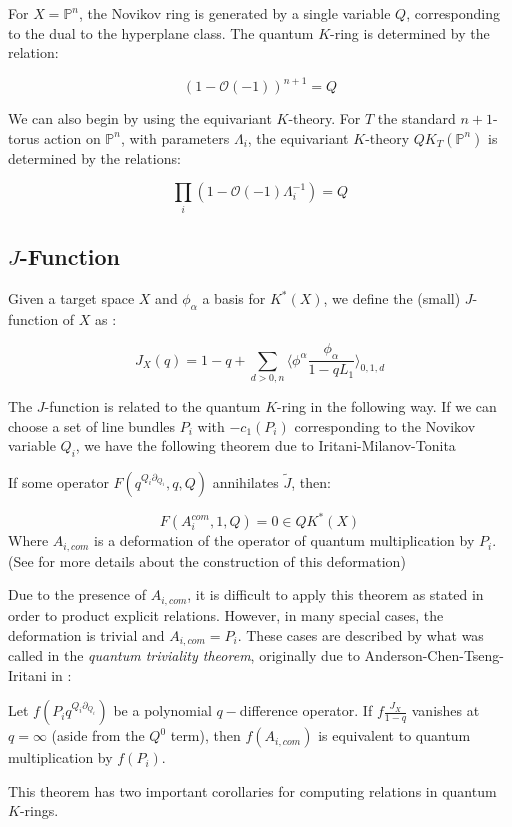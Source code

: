 \documentclass[11pt,letterpaper]{amsart}
\begin{document}
\begin{ex}
    For $X=\mathbb{P}^n$, the Novikov ring is generated by a single variable $Q$, corresponding to the dual to the hyperplane class. The quantum $K$-ring is determined by the relation:

    $$(1-\mathcal{O}(-1))^{n+1}=Q$$

    We can also begin by using the equivariant $K$-theory. For $T$ the standard $n+1$-torus action on $\mathbb{P}^n$, with parameters $\Lambda_i$, the equivariant $K$-theory $QK_T(\mathbb{P}^n)$ is determined by the relations:

    $$\prod_i(1-\mathcal{O}(-1)\Lambda_i^{-1})=Q$$
    \end{ex}
\subsection{$J$-Function}

Given a target space $X$ and $\phi_\alpha$ a basis for $K^*(X)$, we define the (small) $J$-function of $X$ as :

$$J_X(q)=1-q+\sum_{d>0,n} \langle\phi^\alpha\frac{\phi_\alpha}{1-qL_1}\rangle_{0,1,d} $$

The $J$-function is related to the quantum $K$-ring in the following way. If we can choose a set of line bundles $P_i$ with $-c_1(P_i)$ corresponding to the Novikov variable $Q_i$, we have the following theorem due to Iritani-Milanov-Tonita

\begin{thm}
\label{imt}
If some operator $F(q^{Q_i\partial_{Q_i}},q,Q)$ annihilates $\tilde{J}$, then: 

$$F(A_i^{com},1,Q)=0\in QK^*(X)$$
Where $A_{i,com}$ is a deformation of the operator of quantum multiplication by $P_i$. (See \cite{IMT} for more details about the construction of this deformation)
\end{thm}

Due to the presence of $A_{i,com}$, it is difficult to apply this theorem as stated in order to product explicit relations. However, in many special cases, the deformation is trivial and $A_{i,com}=P_i$. These cases are described by what was called in \cite{me} the \textit{quantum triviality theorem}, originally due to Anderson-Chen-Tseng-Iritani in \cite{act}:

\begin{thm}
\label{qtriv}
    Let $f(P_iq^{Q_i\partial_{Q_i}})$ be a polynomial $q-$difference operator. If $f\frac{J_X}{1-q}$ vanishes at $q=\infty$ (aside from the $Q^0$ term), then $f(A_{i,com})$ is equivalent to quantum multiplication by $f(P_i)$.
\end{thm}
This theorem has two important corollaries for computing relations in quantum $K$-rings. 
\end{document}
